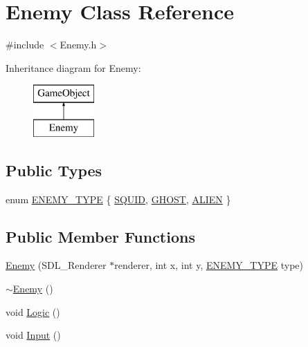 \hypertarget{class_enemy}{}\section{Enemy Class Reference}
\label{class_enemy}


{\ttfamily \#include $<$Enemy.\+h$>$}

Inheritance diagram for Enemy\+:\begin{figure}[H]
\begin{center}
\leavevmode
\includegraphics[height=2.000000cm]{class_enemy}
\end{center}
\end{figure}
\subsection*{Public Types}
\begin{DoxyCompactItemize}
\item 
enum \mbox{\hyperlink{class_enemy_ae6c971b1c4da1335dfd6542dea6efecb}{E\+N\+E\+M\+Y\+\_\+\+T\+Y\+PE}} \{ \mbox{\hyperlink{class_enemy_ae6c971b1c4da1335dfd6542dea6efecbaa842e3e91308061ef257ce005b8426be}{S\+Q\+U\+ID}}, 
\mbox{\hyperlink{class_enemy_ae6c971b1c4da1335dfd6542dea6efecba57bf1820642551b8e2e260613b8dce50}{G\+H\+O\+ST}}, 
\mbox{\hyperlink{class_enemy_ae6c971b1c4da1335dfd6542dea6efecbaaf4e9f1052313811c191ab9db18005e9}{A\+L\+I\+EN}}
 \}
\end{DoxyCompactItemize}
\subsection*{Public Member Functions}
\begin{DoxyCompactItemize}
\item 
\mbox{\hyperlink{class_enemy_ac14d80ce4f82c579e5fe1406e5bb25fa}{Enemy}} (S\+D\+L\+\_\+\+Renderer $\ast$renderer, int x, int y, \mbox{\hyperlink{class_enemy_ae6c971b1c4da1335dfd6542dea6efecb}{E\+N\+E\+M\+Y\+\_\+\+T\+Y\+PE}} type)
\item 
\mbox{\hyperlink{class_enemy_ac0eec4755e28c02688065f9657150ac3}{$\sim$\+Enemy}} ()
\item 
void \mbox{\hyperlink{class_enemy_adcde768475970dae1e4c3e76fb59bc46}{Logic}} ()
\item 
void \mbox{\hyperlink{class_enemy_ad4958e67a70c706e37a80b285ac89854}{Input}} ()
\end{DoxyCompactItemize}
